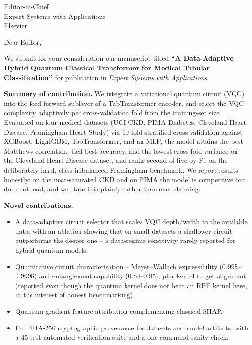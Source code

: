 \documentclass[12pt]{letter}
\begin{document}
\begin{letter}{Editor-in-Chief\\Expert Systems with Applications\\Elsevier}

\opening{Dear Editor,}

We submit for your consideration our manuscript titled
\textbf{``A Data-Adaptive Hybrid Quantum-Classical Transformer for Medical
Tabular Classification''} for publication in \textit{Expert Systems with
Applications}.

\textbf{Summary of contribution.}
We integrate a variational quantum circuit (VQC) into the feed-forward sublayer
of a TabTransformer encoder, and select the VQC complexity adaptively per
cross-validation fold from the training-set size. Evaluated on four medical
datasets (UCI CKD, PIMA Diabetes, Cleveland Heart Disease, Framingham Heart
Study) via 10-fold stratified cross-validation against XGBoost, LightGBM,
TabTransformer, and an MLP, the model attains the best Matthews correlation,
tied-best accuracy, and the lowest cross-fold variance on the Cleveland Heart
Disease dataset, and ranks second of five by F1 on the deliberately hard,
class-imbalanced Framingham benchmark. We report results honestly: on the
near-saturated CKD and on PIMA the model is competitive but does not lead, and
we state this plainly rather than over-claiming.

\textbf{Novel contributions.}
\begin{itemize}
  \item A data-adaptive circuit selector that scales VQC depth/width to the
        available data, with an ablation showing that on small datasets a
        shallower circuit outperforms the deeper one -- a data-regime sensitivity
        rarely reported for hybrid quantum models.
  \item Quantitative circuit characterisation -- Meyer--Wallach expressibility
        (0.995--0.9996) and entanglement capability (0.84--0.95), plus kernel
        target alignment (reported even though the quantum kernel does not beat
        an RBF kernel here, in the interest of honest benchmarking).
  \item Quantum gradient feature attribution complementing classical SHAP.
  \item Full SHA-256 cryptographic provenance for datasets and model artifacts,
        with a 45-test automated verification suite and a one-command sanity check.
\end{itemize}


\end{letter}
\end{document}
